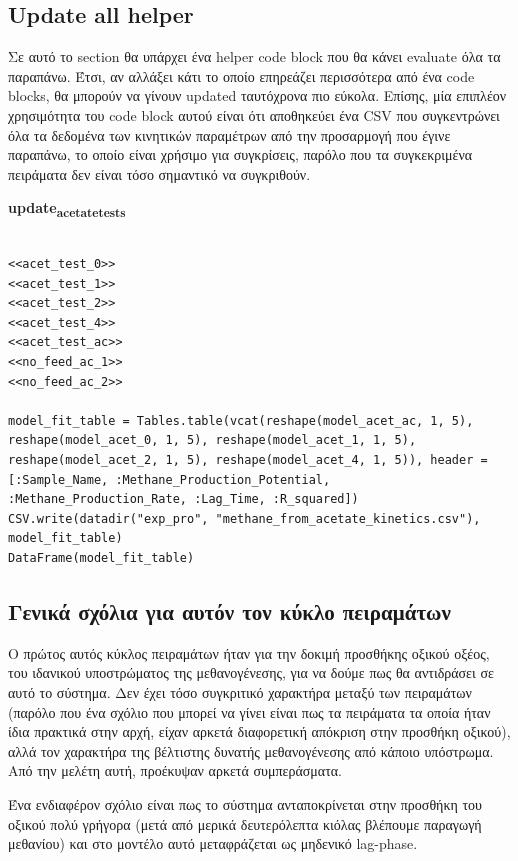 \documentclass[11pt]{article}
\begin{document}
\subsection{Update all helper}
\label{sec:org75331fc}
Σε αυτό το section θα υπάρχει ένα helper code block που θα κάνει evaluate όλα τα παραπάνω. Έτσι, αν αλλάξει κάτι το οποίο επηρεάζει περισσότερα από ένα code blocks, θα μπορούν να γίνουν updated ταυτόχρονα πιο εύκολα. Επίσης, μία επιπλέον χρησιμότητα του code block αυτού είναι ότι αποθηκεύει ένα CSV που συγκεντρώνει όλα τα δεδομένα των κινητικών παραμέτρων από την προσαρμογή που έγινε παραπάνω, το οποίο είναι χρήσιμο για συγκρίσεις, παρόλο που τα συγκεκριμένα πειράματα δεν είναι τόσο σημαντικό να συγκριθούν.

\textbf{update\textsubscript{acetate}\textsubscript{tests}}
\begin{verbatim}

<<acet_test_0>>
<<acet_test_1>>
<<acet_test_2>>
<<acet_test_4>>
<<acet_test_ac>>
<<no_feed_ac_1>>
<<no_feed_ac_2>>

model_fit_table = Tables.table(vcat(reshape(model_acet_ac, 1, 5), reshape(model_acet_0, 1, 5), reshape(model_acet_1, 1, 5), reshape(model_acet_2, 1, 5), reshape(model_acet_4, 1, 5)), header = [:Sample_Name, :Methane_Production_Potential, :Methane_Production_Rate, :Lag_Time, :R_squared])
CSV.write(datadir("exp_pro", "methane_from_acetate_kinetics.csv"), model_fit_table)
DataFrame(model_fit_table)

\end{verbatim}

\subsection{Γενικά σχόλια για αυτόν τον κύκλο πειραμάτων}
\label{sec:orgaeea496}
Ο πρώτος αυτός κύκλος πειραμάτων ήταν για την δοκιμή προσθήκης οξικού οξέος, του ιδανικού υποστρώματος της μεθανογένεσης, για να δούμε πως θα αντιδράσει σε αυτό το σύστημα. Δεν έχει τόσο συγκριτικό χαρακτήρα μεταξύ των πειραμάτων (παρόλο που ένα σχόλιο που μπορεί να γίνει είναι πως τα πειράματα τα οποία ήταν ίδια πρακτικά στην αρχή, είχαν αρκετά διαφορετική απόκριση στην προσθήκη οξικού), αλλά τον χαρακτήρα της βέλτιστης δυνατής μεθανογένεσης από κάποιο υπόστρωμα. Από την μελέτη αυτή, προέκυψαν αρκετά συμπεράσματα.

Ένα ενδιαφέρον σχόλιο είναι πως το σύστημα ανταποκρίνεται στην προσθήκη του οξικού πολύ γρήγορα (μετά από μερικά δευτερόλεπτα κιόλας βλέπουμε παραγωγή μεθανίου) και στο μοντέλο αυτό μεταφράζεται ως μηδενικό lag-phase.
\end{document}
